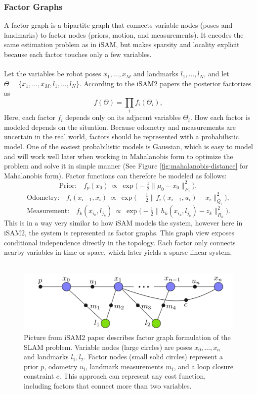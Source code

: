 \subsubsection{Factor Graphs}
A factor graph is a bipartite graph that connects variable nodes (poses and landmarks) to factor nodes (priors, motion, and measurements). It encodes the same estimation problem as in iSAM, but makes sparsity and locality explicit because each factor touches only a few variables.
\\ \\
Let the variables be robot poses $x_1,\dots,x_M$ and landmarks $l_1,\dots,l_N$, and let $\Theta=\{x_1,\dots,x_M,l_1,\dots,l_N\}$. According to the iSAM2 papers \cite{iSAM2_paper,Bayes_tree_for_SLAM_paper} the posterior factorizes as
\[
    f(\Theta) = \prod_{i} f_i(\Theta_i),
\]
Here, each factor $f_i$ depends only on its adjacent variables $\Theta_i$. How each factor is modeled depends on the situation. Because odometry and measurements are uncertain in the real world, factors should be represented with a probabilistic model. One of the easiest probabilistic models is Gaussian, which is easy to model and will work well later when working in Mahalanobis form to optimize the problem and solve it in simple manner (See Figure \ref{fig:mahalanobis-distance} for Mahalanobis form). Factor functions can therefore be modeled as follows:
\[
    \text{Prior:}\quad f_p(x_0)\ \propto\ \exp\!\Big(-\tfrac{1}{2}\|\mu_0 - x_0\|_{P_0}^2\Big),
\]
\[
    \text{Odometry:}\quad f_i(x_{i-1},x_i)\ \propto\ \exp\!\Big(-\tfrac{1}{2}\|f_i(x_{i-1},u_i) - x_i\|_{Q_i}^2\Big),
\]
\[
    \text{Measurement:}\quad f_k(x_{i_k},l_{j_k})\ \propto\ \exp\!\Big(-\tfrac{1}{2}\|h_k(x_{i_k},l_{j_k}) - z_k\|_{R_k}^2\Big).
\]
This is in a way very similar to how iSAM models the system, however here in iSAM2, the system is represented as factor graphs. This graph view exposes conditional independence directly in the topology. Each factor only connects nearby variables in time or space, which later yields a sparse linear system.
\\ \\
\begin{figure}[H]
    \centering
    \includegraphics[width=0.98\linewidth]{Pictures/Optimizers/iSAM2/Factor_graph.png}
    \caption{Picture from iSAM2 paper \cite{iSAM2_paper} describes factor graph formulation of the SLAM problem. Variable nodes (large circles) are poses $x_0,\dots,x_n$ and landmarks $l_1,l_2$. Factor nodes (small solid circles) represent a prior $p$, odometry $u_i$, landmark measurements $m_i$, and a loop closure constraint $c$. This approach can represent any cost function, including factors that connect more than two variables.}
    \label{fig:optimizer-iSAM2-factor-graph}
\end{figure}
